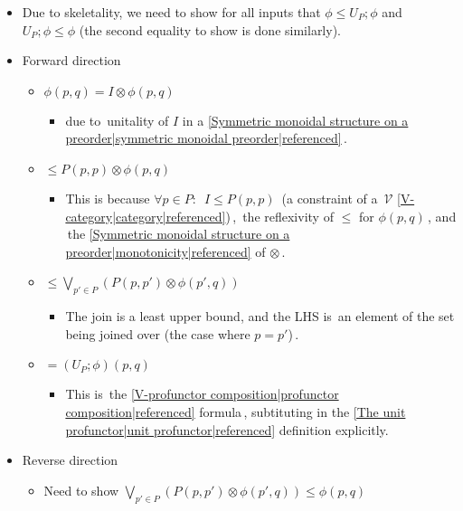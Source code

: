 \begin{itemize}
    \item Due to skeletality, we need to show for all inputs that $\phi \leq U_P;\phi$ and $U_P;\phi \leq \phi$ (the second equality to show is done similarly).
    \item Forward direction
          \begin{itemize}
            \item $\phi(p,q) = I \otimes \phi(p,q)$
                  \begin{itemize}
                    \item due to \,unitality of $I$ in a \ref{Symmetric monoidal structure on a preorder|symmetric monoidal preorder|referenced}\,.
                  \end{itemize}
            \item $\leq P(p,p) \otimes \phi(p,q)$
                  \begin{itemize}
                    \item This is because $\forall p \in P:$ \,$I \leq P(p,p)$\, (a constraint of a \,$\mathcal{V}$ \ref{V-category|category|referenced})\,, \,the reflexivity of $\leq$ for $\phi(p,q)$\,, and \,the \ref{Symmetric monoidal structure on a preorder|monotonicity|referenced} of $\otimes$\,.
                  \end{itemize}
            \item $\leq \underset{p' \in P}\bigvee(P(p,p') \otimes \phi(p',q))$
                  \begin{itemize}
                    \item The join is a least upper bound, and the LHS is \,an element of the set being joined over (the case where $p=p'$)\,.
                  \end{itemize}
            \item $= (U_P;\phi)(p,q)$
                  \begin{itemize}
                    \item This is \,the \ref{V-profunctor composition|profunctor composition|referenced} formula\,, subtituting in the \ref{The unit profunctor|unit profunctor|referenced} definition explicitly.
                  \end{itemize}
          \end{itemize}
    \item Reverse direction
          \begin{itemize}
            \item Need to show $\underset{p' \in P}\bigvee(P(p,p')\otimes \phi(p',q)) \leq \phi(p,q)$

\end{itemize}
\end{itemize}
